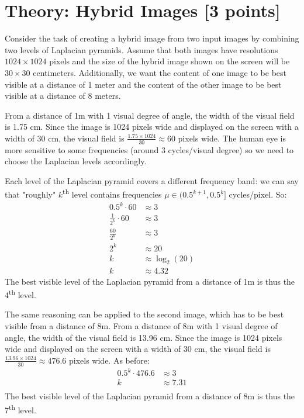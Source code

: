 \documentclass[tikz,14pt,fleqn]{article}
\begin{document}
 
\section{Theory: Hybrid Images [3 points]}
Consider the task of creating a hybrid image from two input images by combining two levels of Laplacian
pyramids. Assume that both images have resolutions $1024 \times 1024$ pixels and the size of the hybrid image
shown on the screen will be $30 \times 30$ centimeters. Additionally, we want the content of one image to be best visible at a distance of 1 meter and the content of the other image to be best visible at a distance of 8 meters. 

From a distance of 1m with 1 visual degree of angle, the width of the visual field is 1.75 cm.
Since the image is 1024 pixels wide and displayed on the screen with a width of 30 cm, the visual field is $\frac{1.75\times 1024}{30} \approx 60$ pixels wide.
The human eye is more sensitive to some frequencies (around 3 cycles/visual degree) so we need to choose the Laplacian levels accordingly.

Each level of the Laplacian pyramid covers a different frequency band: we can say that "roughly" $k$\textsuperscript{th} level contains frequencies $\mu \in (0.5^{k+1},0.5^{k}]$ cycles/pixel.
So:
\begin{align*}
    0.5^k \cdot 60 &\approx 3 \\
    \frac1{2^k} \cdot 60 &\approx 3 \\
    \frac{60}{2^k} &\approx 3 \\
    2^k &\approx 20 \\
    k &\approx \log_2(20) \\
    k &\approx 4.32
\end{align*}
The best visible level of the Laplacian pyramid from a distance of 1m is thus the 4\textsuperscript{th} level.

The same reasoning can be applied to the second image, which has to be best visible from a distance of 8m.
From a distance of 8m with 1 visual degree of angle, the width of the visual field is 13.96 cm.
Since the image is 1024 pixels wide and displayed on the screen with a width of 30 cm, the visual field is $\frac{13.96\times 1024}{30} \approx 476.6$ pixels wide.
As before:
\begin{align*}
    0.5^k \cdot 476.6 &\approx 3 \\
    k &\approx 7.31 \\
\end{align*}
The best visible level of the Laplacian pyramid from a distance of 8m is thus the 7\textsuperscript{th} level.
\end{document}
